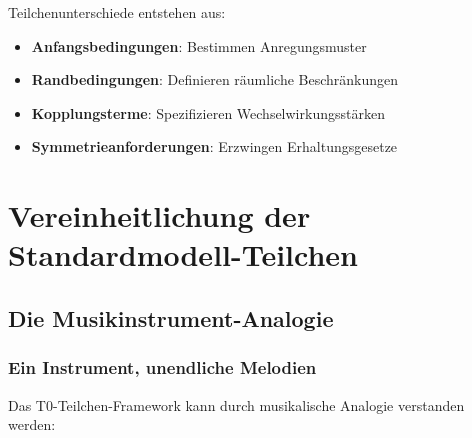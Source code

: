 	Teilchenunterschiede entstehen aus:
	\begin{itemize}
		\item \textbf{Anfangsbedingungen}: Bestimmen Anregungsmuster
		\item \textbf{Randbedingungen}: Definieren räumliche Beschränkungen  
		\item \textbf{Kopplungsterme}: Spezifizieren Wechselwirkungsstärken
		\item \textbf{Symmetrieanforderungen}: Erzwingen Erhaltungsgesetze
	\end{itemize}
	
	\section{Vereinheitlichung der Standardmodell-Teilchen}
	\label{sec:sm_vereinheitlichung}
	
	\subsection{Die Musikinstrument-Analogie}
	\label{subsec:musikinstrument_analogie}
	
	\subsubsection{Ein Instrument, unendliche Melodien}
	\label{subsubsec:ein_instrument}
	
	Das T0-Teilchen-Framework kann durch musikalische Analogie verstanden werden:
	
	\begin{table}[htbp]
		\centering
		\caption{Musikalische Analogie für T0-Teilchenphysik}
		\label{tab:musikinstrument_analogie}
	\end{table}
	

